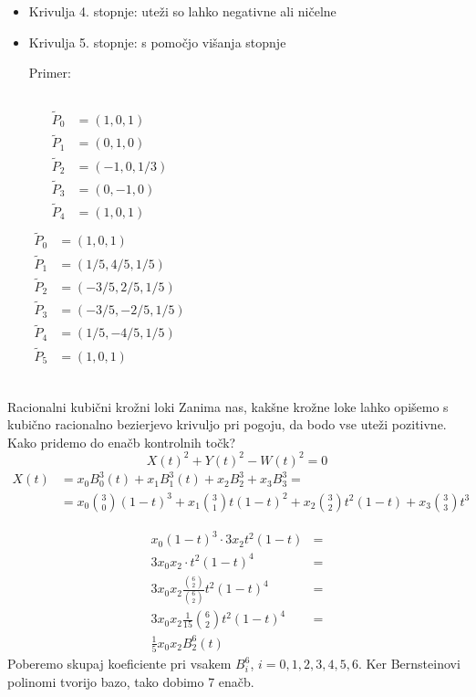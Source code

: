 \documentclass[t]{beamer}
\begin{document}
\begin{frame}
\begin{itemize}
\item Krivulja 4. stopnje: uteži so lahko negativne ali ničelne
\item Krivulja 5. stopnje: s pomočjo višanja stopnje

Primer:
\begin{columns}
	\begin{align*}
	\tilde{P}_0 &= (1,0, 1)\\
	\tilde{P}_1 &= (0, 1, 0)\\
	\tilde{P}_2 &= (-1, 0, 1/3)\\
	\tilde{P}_3 &= (0, -1, 0)\\
	\tilde{P}_4 &= (1, 0, 1) \\
	\end{align*}
    \begin{align*}
	\tilde{P}_0 &= (1,0, 1)\\
	\tilde{P}_1 &= (1/5, 4/5, 1/5)\\
	\tilde{P}_2 &= (-3/5, 2/5, 1/5)\\
	\tilde{P}_3 &= (-3/5, -2/5, 1/5)\\
	\tilde{P}_4 &= (1/5, -4/5, 1/5)\\
	\tilde{P}_5 &= (1, 0, 1) \\
	\end{align*}
\end{columns}

\end{itemize}
\end{frame}

\begin{frame}{Racionalni kubični krožni loki}
Zanima nas, kakšne krožne loke lahko opišemo s kubično racionalno bezierjevo krivuljo pri pogoju, da bodo vse uteži pozitivne.
Kako pridemo do enačb kontrolnih točk?
$$
X(t)^2 + Y(t)^2 - W(t)^2 = 0
$$
\begin{align*}
X(t) &= x_{0} B_{0}^3 (t) + x_{1} B_{1}^3 (t) + x_{2} B_{2}^3 + x_{3} B_{3}^3 = \\
&= x_{0} \binom{3}{0} (1-t)^3 + x_{1} \binom{3}{1} t(1-t)^2 + x_{2} \binom{3}{2} t^2(1-t) + x_{3} \binom{3}{3} t^3
\end{align*}
\end{frame}

\begin{frame}
\begin{align*}
x_{0}(1-t)^3 \cdot 3x_{2}t^2(1-t) &= \\
3x_{0} x_{2} \cdot t^2 (1-t)^4 & = \\
3x_{0}x_{2} \frac{\binom{6}{2}}{\binom{6}{2}} t^2 (1-t)^4 &= \\
3x_{0}x_{2} \frac{1}{15} \binom{6}{2} t^2 (1-t)^4 &= \\
\frac{1}{5} x_{0}x_{2} B_{2}^6(t)
\end{align*}
Poberemo skupaj koeficiente pri vsakem $B_{i}^6$, $i=0,1,2,3,4,5,6$. Ker Bernsteinovi polinomi tvorijo bazo, tako dobimo 7 enačb.
\end{frame}
\end{document}
